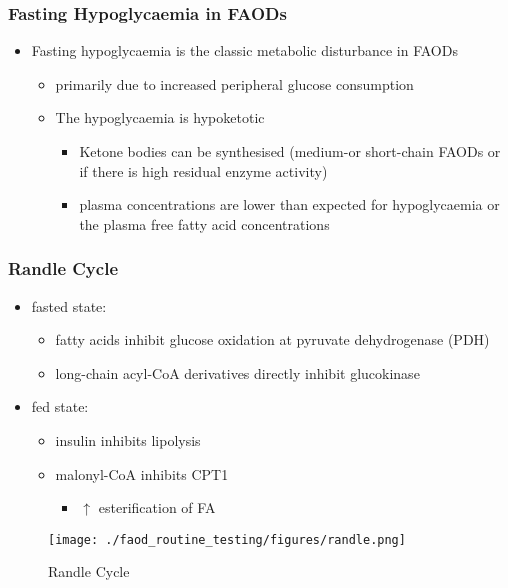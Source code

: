 \documentclass{scrartcl}
\begin{document}
\subsubsection{Fasting Hypoglycaemia  in FAODs}
\label{sec:org3b92829}
\begin{itemize}
\item Fasting hypoglycaemia is the classic metabolic disturbance in FAODs
\begin{itemize}
\item primarily due to increased peripheral glucose consumption
\end{itemize}
\begin{itemize}
\item The hypoglycaemia is hypoketotic
\begin{itemize}
\item Ketone bodies can be synthesised (medium-or short-chain FAODs or
if there is high residual enzyme activity)
\item plasma concentrations are lower than expected for hypoglycaemia or
the plasma free fatty acid concentrations
\end{itemize}
\end{itemize}
\end{itemize}

\subsubsection{Randle Cycle}
\label{sec:org4710b11}
\begin{itemize}
\item fasted state:
\begin{itemize}
\item fatty acids inhibit glucose oxidation at pyruvate dehydrogenase
(PDH)
\item long-chain acyl-CoA derivatives directly inhibit glucokinase
\end{itemize}
\item fed state:
\begin{itemize}
\item insulin inhibits lipolysis
\item malonyl-CoA inhibits CPT1
\begin{itemize}
\item \(\uparrow\) esterification of FA
\end{itemize}
\end{itemize}
\end{itemize}

\begin{figure}[htbp]
\centering
\texttt{[image: ./faod\_routine\_testing/figures/randle.png]}
\caption{\label{fig:orgae027c8}
Randle Cycle}
\end{figure}
\end{document}
